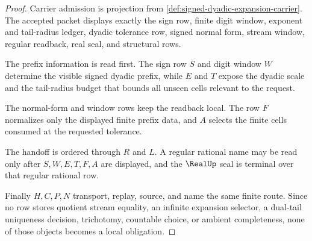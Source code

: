 \begin{proof}
Carrier admission is projection from \autoref{def:signed-dyadic-expansion-carrier}. The accepted packet displays exactly the sign row, finite digit window, exponent and tail-radius ledger, dyadic tolerance row, signed normal form, stream window, regular readback, real seal, and structural rows.

The prefix information is read first. The sign row $S$ and digit window $W$ determine the visible signed dyadic prefix, while $E$ and $T$ expose the dyadic scale and the tail-radius budget that bounds all unseen cells relevant to the request.

The normal-form and window rows keep the readback local. The row $F$ normalizes only the displayed finite prefix data, and $A$ selects the finite cells consumed at the requested tolerance.

The handoff is ordered through $R$ and $L$. A regular rational name may be read only after $S,W,E,T,F,A$ are displayed, and the $\RealUp$ seal is terminal over that regular rational row.

Finally $H,C,P,N$ transport, replay, source, and name the same finite route. Since no row stores quotient stream equality, an infinite expansion selector, a dual-tail uniqueness decision, trichotomy, countable choice, or ambient completeness, none of those objects becomes a local obligation.
\end{proof}

